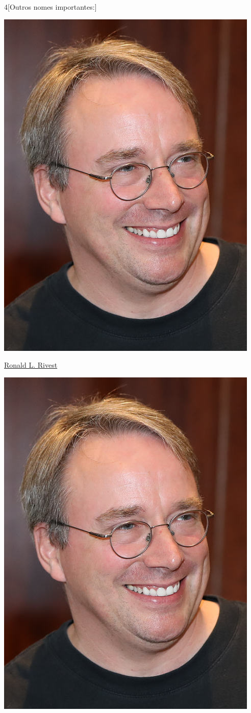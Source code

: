 \begin{multicols}{4}[Outros nomes importantes:]
\begin{center}
					\includegraphics[width=.8\columnwidth]{./IMG-GIT/CIENTISTAS/linus.jpeg}
\end{center}
				
\vfill\null

\columnbreak				
				
				\href{https://pt.wikipedia.org/wiki/Ronald_L._Rivest}{Ronald L. Rivest}
				
\begin{center}
					\includegraphics[width=.8\columnwidth]{./IMG-GIT/CIENTISTAS/linus.jpeg}
\end{center}
				

\end{multicols}
